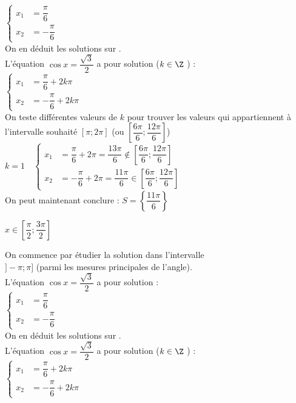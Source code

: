 \documentclass[11pt,a4paper]{article}  %
\begin{document}
\begin{enumMet}
\begin{enumMet}
\begin{corrBox}
					$\begin{cases}
						x_1 &=\dfrac{\pi}{6}\\
						x_2 &=-\dfrac{\pi}{6}
					\end{cases}$\\
					On en déduit les solutions sur \R.\\
					L'équation $\cos x=\dfrac{\sqrt{3}}{2}$ a pour solution ($k\in \Z$ ) :\\
					$\begin{cases}
						x_1 &=\dfrac{\pi}{6}+2k\pi\\
						x_2 &=-\dfrac{\pi}{6}+2k\pi\
					\end{cases}$\\
					On teste différentes valeurs de $k$ pour trouver les valeurs qui appartiennent à l'intervalle souhaité $[\pi;2\pi]$ (ou $\left[\dfrac{6\pi}{6};\dfrac{12\pi}{6}\right]$)\\
					$k=1\quad \begin{cases}
						x_1 &=\dfrac{\pi}{6}+2\pi=\dfrac{13\pi}{6}\notin\left[\dfrac{6\pi}{6};\dfrac{12\pi}{6}\right]\\
						x_2 &=-\dfrac{\pi}{6}+2\pi=\dfrac{11\pi}{6}\in\left[\dfrac{6\pi}{6};\dfrac{12\pi}{6}\right]
					\end{cases}$\\
					On peut maintenant conclure : $S=\left\{\dfrac{11\pi}{6}\right\}$	
				\end{corrBox}
				\item $x \in\left[\dfrac{\pi}{2} ; \dfrac{3 \pi}{2}\right]$
				\begin{corrBox}
					On commence par étudier la solution dans l'intervalle\\ $]-\pi;\pi]$ (parmi les mesures principales de l'angle).\\
					L'équation $\cos x=\dfrac{\sqrt{3}}{2}$ a pour solution :\\
					$\begin{cases}
						x_1 &=\dfrac{\pi}{6}\\
						x_2 &=-\dfrac{\pi}{6}
					\end{cases}$\\
					On en déduit les solutions sur \R.\\
					L'équation $\cos x=\dfrac{\sqrt{3}}{2}$ a pour solution ($k\in \Z$ ) :\\
					$\begin{cases}
						x_1 &=\dfrac{\pi}{6}+2k\pi\\
						x_2 &=-\dfrac{\pi}{6}+2k\pi\
					\end{cases}$\\

\end{corrBox}
\end{enumMet}
\end{enumMet}
\end{document}
